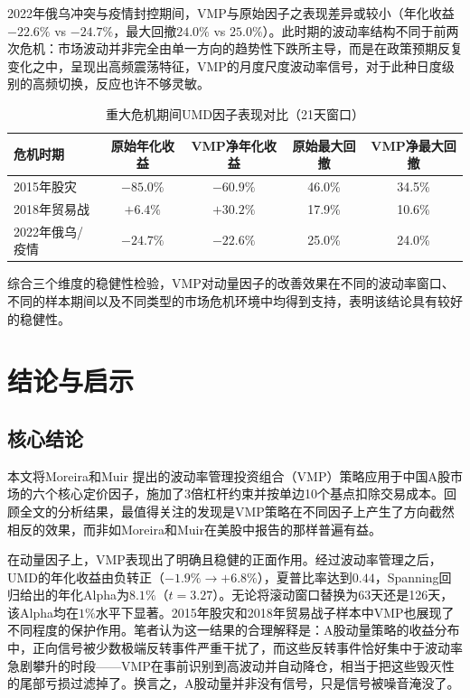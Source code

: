 \documentclass[
    decl-page,
    oneside,
  ]{njuthesis}
\begin{document}
2022年俄乌冲突与疫情封控期间，VMP与原始因子之表现差异或较小（年化收益$-22.6\%$ vs $-24.7\%$，最大回撤$24.0\%$ vs $25.0\%$）。此时期的波动率结构不同于前两次危机：市场波动并非完全由单一方向的趋势性下跌所主导，而是在政策预期反复变化之中，呈现出高频震荡特征，VMP的月度尺度波动率信号，对于此种日度级别的高频切换，反应也许不够灵敏。


\begin{table}[htbp]
  \centering
  \caption{重大危机期间UMD因子表现对比（21天窗口）}
  \label{tab:robust_crisis}
  \begin{tabular}{lcccc}
    \toprule
    危机时期 & 原始年化收益 & VMP净年化收益 & 原始最大回撤 & VMP净最大回撤 \\
    \midrule
    2015年股灾 & $-85.0\%$ & $-60.9\%$ & 46.0\% & 34.5\% \\
    2018年贸易战 & $+6.4\%$ & $+30.2\%$ & 17.9\% & 10.6\% \\
    2022年俄乌/疫情 & $-24.7\%$ & $-22.6\%$ & 25.0\% & 24.0\% \\
    \bottomrule
  \end{tabular}
\end{table}

综合三个维度的稳健性检验，VMP对动量因子的改善效果在不同的波动率窗口、不同的样本期间以及不同类型的市场危机环境中均得到支持，表明该结论具有较好的稳健性。


\chapter{结论与启示}

\section{核心结论}

本文将Moreira和Muir \cite{moreira2017volatility} 提出的波动率管理投资组合（VMP）策略应用于中国A股市场的六个核心定价因子，施加了3倍杠杆约束并按单边10个基点扣除交易成本。回顾全文的分析结果，最值得关注的发现是VMP策略在不同因子上产生了方向截然相反的效果，而非如Moreira和Muir在美股中报告的那样普遍有益。

在动量因子上，VMP表现出了明确且稳健的正面作用。经过波动率管理之后，UMD的年化收益由负转正（$-1.9\% \rightarrow +6.8\%$），夏普比率达到$0.44$，Spanning回归给出的年化Alpha为$8.1\%$（$t = 3.27$）。无论将滚动窗口替换为63天还是126天，该Alpha均在$1\%$水平下显著。2015年股灾和2018年贸易战子样本中VMP也展现了不同程度的保护作用。笔者认为这一结果的合理解释是：A股动量策略的收益分布中，正向信号被少数极端反转事件严重干扰了，而这些反转事件恰好集中于波动率急剧攀升的时段——VMP在事前识别到高波动并自动降仓，相当于把这些毁灭性的尾部亏损过滤掉了。换言之，A股动量并非没有信号，只是信号被噪音淹没了。
\end{document}
